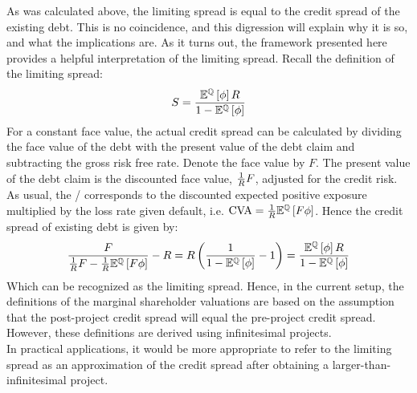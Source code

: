 \documentclass[main.tex]{subfiles}
\begin{document}
    As was calculated above, the limiting spread is equal to the credit spread of the existing debt.
    This is no coincidence, and this digression will explain why it is so,
    and what the implications are.
    As it turns out, 
    the framework presented here provides a helpful interpretation of the limiting spread.
    Recall the definition of the limiting spread:
        \begin{equation*}
            S
            =
            \frac{
                \mathbb{E}^{\mathbb{Q}}\left[\phi\right]
                R
            }{
                1
                -
                \mathbb{E}^{\mathbb{Q}}\left[\phi\right]
            }
        \end{equation*}
    For a constant face value,
    the actual credit spread can be calculated by dividing the face value of the debt
    with the present value of the debt claim and subtracting the gross risk free rate.
    Denote the face value by $F$. 
    The present value of the debt claim is the discounted face value, $\frac{1}{R} F$,
    adjusted for the credit risk. 
    As usual, the \CVA/ corresponds to the discounted expected positive exposure
    multiplied by the loss rate given default, 
    i.e. $\CVA/ = \discountfactor\mathbb{E}^{\rnmeasure}\left[F \phi \right] $.
    Hence the credit spread of existing debt is given by:
        \begin{equation*}
            \frac{
                F
            }{
                \frac{1}{R} F
                -
                \frac{1}{R}
                \mathbb{E}^{\mathbb{Q}}\left[
                    F \phi
                \right] 
            } 
            -
            R
            =
            R \left(
            \frac{
                1
            }{
                    1
                    -
                    \mathbb{E}^{\mathbb{Q}}\left[
                        \phi
                    \right] 
            } 
            - 
            1
            \right)
            =
            \frac{
                \mathbb{E}^{\mathbb{Q}}\left[\phi\right]
                R
            }{
                1
                -
                \mathbb{E}^{\mathbb{Q}}\left[\phi\right]
            }
        \end{equation*}
        Which can be recognized as the limiting spread. 
        Hence, in the current setup, 
        the definitions of the marginal shareholder valuations are based on
        the assumption that the post-project credit spread 
        will equal the pre-project credit spread.
        However, these definitions are derived using infinitesimal projects.
        \\
        In practical applications,
        it would be more appropriate to refer to the limiting spread as an approximation 
        of the credit spread after obtaining a larger-than-infinitesimal project.
        
\end{document}
